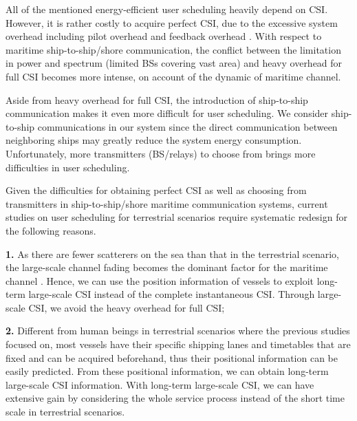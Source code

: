 \documentclass{ieeeaccess}
\begin{document}
All of the mentioned energy-efficient user scheduling heavily depend on CSI. However, it is rather costly to acquire perfect CSI, due to the excessive system overhead including pilot overhead and feedback overhead \cite{p403}. 
With respect to maritime ship-to-ship/shore communication, the conflict between the limitation in power and spectrum (limited BSs covering vast area) and heavy overhead for full CSI becomes more intense, on account of the dynamic of maritime channel.

Aside from heavy overhead for full CSI, the introduction of ship-to-ship communication \cite{p404}\cite{p405}
makes it even more difficult for user scheduling. We consider ship-to-ship communications in our system since the direct communication between neighboring ships may greatly reduce the system energy consumption. Unfortunately, more transmitters (BS/relays) to choose from brings more difficulties in user scheduling. 

Given the difficulties for obtaining perfect CSI as well as choosing from transmitters in ship-to-ship/shore maritime communication systems, current studies on user scheduling for terrestrial scenarios require systematic redesign for the following reasons. 

\textbf{1.} As there are fewer scatterers on the sea than that in the terrestrial scenario, the large-scale channel fading becomes the dominant factor for the maritime channel \cite{p403}. Hence, we can use the position information of vessels to exploit long-term large-scale CSI instead of the complete instantaneous CSI. Through large-scale CSI, we avoid the heavy overhead for full CSI; 

\textbf{2.} Different from human beings in terrestrial scenarios where the previous studies focused on, most vessels have their specific shipping lanes and timetables that are fixed and can be acquired beforehand, thus their positional information can be easily predicted. From these positional information, we can obtain long-term large-scale CSI information. With long-term large-scale CSI, we can have extensive gain by considering the whole service process instead of the short time scale in terrestrial scenarios. 

\end{document}
